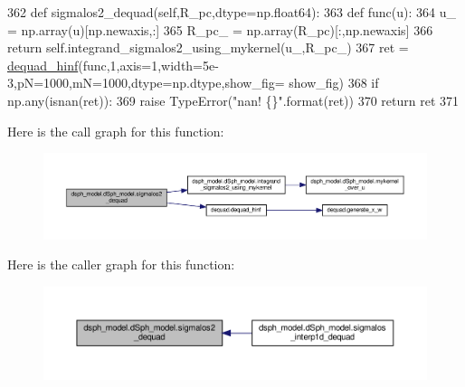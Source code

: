 \begin{DoxyCode}
362     \textcolor{keyword}{def }sigmalos2\_dequad(self,R\_pc,dtype=np.float64):
363         \textcolor{keyword}{def }func(u):
364             u\_ = np.array(u)[np.newaxis,:]
365             R\_pc\_ = np.array(R\_pc)[:,np.newaxis]
366             \textcolor{keywordflow}{return} self.integrand\_sigmalos2\_using\_mykernel(u\_,R\_pc\_)
367         ret = \hyperlink{namespacedequad_a2654bb61f33ab8685320882396c81ae0}{dequad\_hinf}(func,1,axis=1,width=5e-3,pN=1000,mN=1000,dtype=np.dtype,show\_fig=
      show\_fig)
368         \textcolor{keywordflow}{if} np.any(isnan(ret)):
369             \textcolor{keywordflow}{raise} TypeError(\textcolor{stringliteral}{"nan! \{\}"}.format(ret))
370         \textcolor{keywordflow}{return} ret
371     
\end{DoxyCode}
Here is the call graph for this function\+:\nopagebreak
\begin{figure}[H]
\begin{center}
\leavevmode
\includegraphics[width=350pt]{d0/d25/classdsph__model_1_1dSph__model_a87273cf6ad641b1d12f9b236821807c6_cgraph}
\end{center}
\end{figure}
Here is the caller graph for this function\+:\nopagebreak
\begin{figure}[H]
\begin{center}
\leavevmode
\includegraphics[width=350pt]{d0/d25/classdsph__model_1_1dSph__model_a87273cf6ad641b1d12f9b236821807c6_icgraph}
\end{center}
\end{figure}
\mbox{\label{classdsph__model_1_1dSph__model_a855543fee6bd37d3b2e185c2b9dee49e}} 
